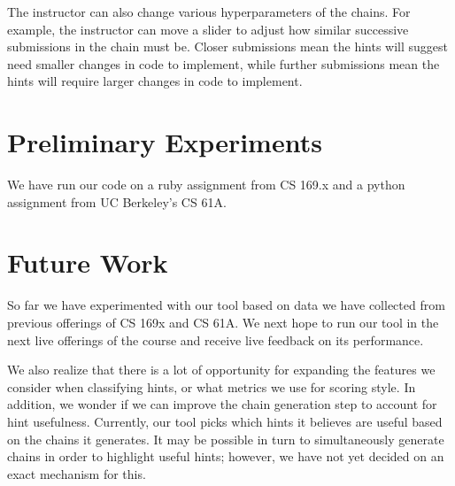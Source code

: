 \documentclass[11pt]{article}
\begin{document}
The instructor can also change various hyperparameters of the chains. For example, the instructor can move a slider to adjust how similar successive submissions in the chain must be. Closer submissions mean the hints will suggest need smaller changes in code to implement, while further submissions mean the hints will require larger changes in code to implement.

\section{Preliminary Experiments}

We have run our code on a ruby assignment from CS 169.x and a python assignment from UC Berkeley's CS 61A.

\section{Future Work}

So far we have experimented with our tool based on data we have collected from previous offerings of CS 169x and CS 61A. We next hope to run our tool in the next live offerings of the course and receive live feedback on its performance. 

We also realize that there is a lot of opportunity for expanding the features we consider when classifying hints, or what metrics we use for scoring style. In addition, we wonder if we can improve the chain generation step to account for hint usefulness. Currently, our tool picks which hints it believes are useful based on the chains it generates. It may be possible in turn to simultaneously generate chains in order to highlight useful hints; however, we have not yet decided on an exact mechanism for this.

\begin{thebibliography}{}

\end{thebibliography}
\end{document}
